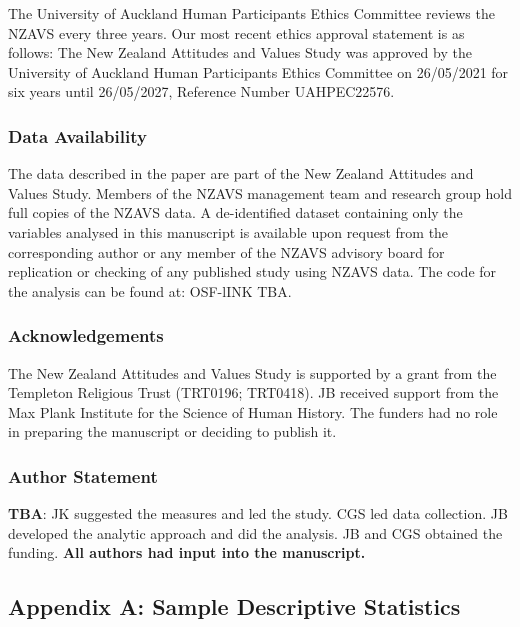 \documentclass[
  single column]{article}
\begin{document}
The University of Auckland Human Participants Ethics Committee reviews
the NZAVS every three years. Our most recent ethics approval statement
is as follows: The New Zealand Attitudes and Values Study was approved
by the University of Auckland Human Participants Ethics Committee on
26/05/2021 for six years until 26/05/2027, Reference Number UAHPEC22576.

\subsubsection{Data Availability}\label{data-availability}

The data described in the paper are part of the New Zealand Attitudes
and Values Study. Members of the NZAVS management team and research
group hold full copies of the NZAVS data. A de-identified dataset
containing only the variables analysed in this manuscript is available
upon request from the corresponding author or any member of the NZAVS
advisory board for replication or checking of any published study using
NZAVS data. The code for the analysis can be found at: OSF-lINK TBA.

\subsubsection{Acknowledgements}\label{acknowledgements}

The New Zealand Attitudes and Values Study is supported by a grant from
the Templeton Religious Trust (TRT0196; TRT0418). JB received support
from the Max Plank Institute for the Science of Human History. The
funders had no role in preparing the manuscript or deciding to publish
it.

\subsubsection{Author Statement}\label{author-statement}

\textbf{TBA}: JK suggested the measures and led the study. CGS led data
collection. JB developed the analytic approach and did the analysis. JB
and CGS obtained the funding. \textbf{All authors had input into the
manuscript.}

\newpage{}

\subsection{Appendix A: Sample Descriptive Statistics}\label{appendix-a}
\end{document}
